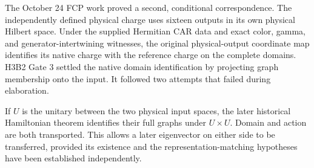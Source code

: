 The October 24 FCP work proved a second, conditional correspondence.
The independently defined physical charge uses sixteen outputs in its
own physical Hilbert space. Under the supplied Hermitian CAR data and
exact color, gamma, and generator-intertwining witnesses, the original
physical-output coordinate map identifies its native charge with the
reference charge on the complete domains. H3B2 Gate 3 settled the
native domain identification by projecting graph membership onto the
input. It followed two attempts that failed during elaboration.

If $U$ is the unitary between the two physical input spaces, the
later historical Hamiltonian theorem identifies their full graphs
under $U\times U$. Domain and action are both transported. This
allows a later eigenvector on either side to be transferred, provided
its existence and the representation-matching hypotheses have been
established independently.
